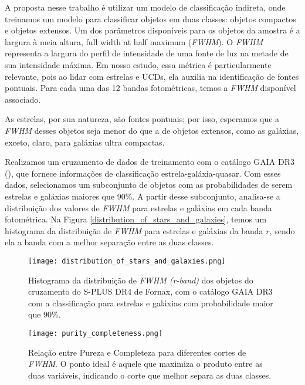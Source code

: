 \vspace{\baselineskip}

A proposta nesse trabalho é utilizar um modelo de classificação indireta, onde treinamos um modelo para classificar objetos em duas classes: objetos compactos e objetos extensos. Um dos parâmetros disponíveis para os objetos da amostra é a largura à meia altura, full width at half maximum (\textit{FWHM}). O \textit{FWHM} representa a largura do perfil de intensidade de uma fonte de luz na metade de sua intensidade máxima. Em nosso estudo, essa métrica é particularmente relevante, pois ao lidar com estrelas e UCDs, ela auxilia na identificação de fontes pontuais. Para cada uma das 12 bandas fotométricas, temos a \textit{FWHM} disponível associado. 

As estrelas, por sua natureza, são fontes pontuais; por isso, esperamos que a \textit{FWHM} desses objetos seja menor do que a de objetos extensos, como as galáxias, exceto, claro, para galáxias ultra compactas.

\vspace{\baselineskip}

Realizamos um cruzamento de dados de treinamento com o catálogo GAIA DR3 (\cite{GAIA_DR3}), que fornece informações de classificação estrela-galáxia-quasar. Com esses dados, selecionamos um subconjunto de objetos com as probabilidades de serem estrelas e galáxias maiores que 90\%. A partir desse subconjunto, analisa-se a distribuição dos valores de \textit{FWHM} para estrelas e galáxias em cada banda fotométrica. Na Figura \ref{distribution_of_stars_and_galaxies}, temos um histograma da distribuição de \textit{FWHM} para estrelas e galáxias da banda $r$, sendo ela a banda com a melhor separação entre as duas classes.

\begin{figure}[!ht]
    \centering
    \begin{minipage}{0.45\textwidth}
        \centering
        \texttt{[image: distribution\_of\_stars\_and\_galaxies.png]}
        \caption{Histograma da distribuição de \textit{FWHM (r-band)} dos objetos do cruzamento do S-PLUS DR4 de Fornax, com o catálogo GAIA DR3 com a classificação para estrelas e galáxias com probabilidade maior que 90\%.}
        \label{distribution_of_stars_and_galaxies}
    \end{minipage}\hfill
    \begin{minipage}{0.45\textwidth}
        \centering
        \texttt{[image: purity\_completeness.png]}
        \caption{Relação entre Pureza e Completeza para diferentes cortes de \textit{FWHM}. O ponto ideal é aquele que maximiza o produto entre as duas variáveis, indicando o corte que melhor separa as duas classes.}
        \label{purity_completeness}
    \end{minipage}
\end{figure}

